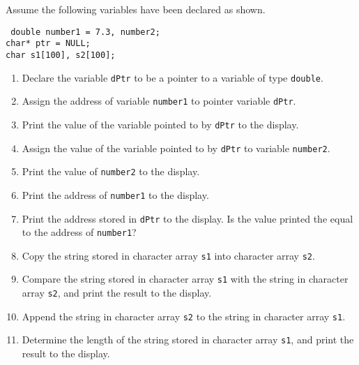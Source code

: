 \documentclass[12pt,notitlepage]{article}
\begin{document}
\thispagestyle{empty}

\noindent
Assume the following variables
have been declared as shown.

\vspace{0.5cm}

\noindent
{\tt
double number1 = 7.3, number2;\\
char* ptr = NULL;\\
char s1[100], s2[100];\\
}

\vspace{0.5cm}

\begin{enumerate}
\item Declare the variable {\tt dPtr} to be a pointer to a variable
of type {\tt double}.
\item Assign the address of variable {\tt number1} to pointer
variable {\tt dPtr}.
\item Print the value of the variable pointed to by {\tt dPtr} to the 
display.
\item Assign the value of the variable pointed to by {\tt dPtr} to
variable {\tt number2}.
\item Print the value of {\tt number2} to the display.
\item Print the address of {\tt number1} to the display.
\item Print the address stored in {\tt dPtr} to the display.
Is the value printed
the equal to the address of {\tt number1}?
\item Copy the string stored in character array {\tt s1} into character
array {\tt s2}.
\item Compare the string stored in character array {\tt s1} with
the string in character array {\tt s2}, and print the result to
the display.
\item Append the string in character array {\tt s2} to the string
in character array {\tt s1}.
\item Determine the length of the string stored in character array {\tt s1},
and print the result to the display.
\end{enumerate}
 
\end{document}

